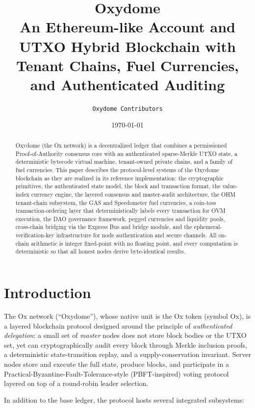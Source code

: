 \documentclass[11pt,a4paper]{article}
\title{\textsf{Oxydome}\\[0.3em]
       \large An Ethereum-like Account and UTXO Hybrid Blockchain with\\
       \large Tenant Chains, Fuel Currencies, and Authenticated Auditing}
\author{
  \texttt{Oxydome Contributors}
}
\date{\today}
\theoremstyle{definition}
\newcommand{\ox}{\textsf{Ox}}
\newcommand{\ohm}{\textsf{OH\scriptsize M}}\newcommand{\evk}{\textsf{EVK}}
\begin{document}
\maketitle

\begin{abstract}
Oxydome (the \ox{} network) is a decentralized ledger that combines a permissioned
Proof-of-Authority consensus core with an authenticated sparse-Merkle UTXO
state, a deterministic bytecode virtual machine, tenant-owned private chains,
and a family of fuel currencies.  This paper describes the protocol-level
systems of the Oxydome blockchain as they are realized in its reference
implementation: the cryptographic primitives, the authenticated state model, the
block and transaction format, the value-index currency engine, the layered
consensus and master-audit architecture, the \ohm{} tenant-chain subsystem, the
GAS and Speedometer fuel currencies, a coin-toss transaction-ordering
layer that deterministically labels every transaction for OVM execution,
the DAO governance framework, pegged
currencies and liquidity pools, cross-chain bridging via the Express Bus and
bridge module, and the ephemeral-verification-key infrastructure for node
authentication and secure channels.  All on-chain arithmetic is integer
fixed-point with no floating point, and every computation is deterministic so
that all honest nodes derive byte-identical results.
\end{abstract}

\tableofcontents
\newpage

\section{Introduction}

The \ox{} network (``Oxydome''), whose native unit is the \ox{} token (symbol
\ox{}), is a layered blockchain protocol designed around the principle of
\emph{authenticated delegation}: a small set of \emph{master} nodes does not
store block bodies or the UTXO set, yet can cryptographically audit every block
through Merkle inclusion proofs, a deterministic state-transition replay, and a
supply-conservation invariant.  Server nodes store and execute the full state,
produce blocks, and participate in a Practical-Byzantine-Fault-Tolerance-style
(PBFT-inspired) voting protocol layered on top of a round-robin leader
selection.

In addition to the base ledger, the protocol hosts several integrated subsystems:
\end{document}
